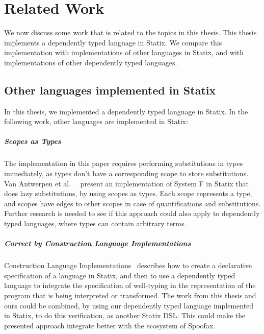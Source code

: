 \chapter{Related Work}
\label{ch:relatedwork}

We now discuss some work that is related to the topics in this thesis. This thesis implements a dependently typed language in Statix. We compare this implementation with implementations of other languages in Statix, and with implementations of other dependently typed languages.

\section{Other languages implemented in Statix}

In this thesis, we implemented a dependently typed language in Statix. In the following work, other languages are implemented in Statix:

\paragraph{Scopes as Types}

The implementation in this paper requires performing substitutions in types immediately, as types don't have a corresponding scope to store substitutions. Van Antwerpen et al.~\cite[sect 2.5]{scopes_as_types}~\cite{nameres} present an implementation of System F in Statix that does lazy substitutions, by using scopes as types. Each scope represents a type, and scopes have edges to other scopes in case of quantifications and substitutions. Further research is needed to see if this approach could also apply to dependently typed languages, where types can contain arbitrary terms. 

\paragraph{Correct by Construction Language Implementations}

Construction Language Implementations~\cite{Rouvoet21} describes how to create a declarative specification of a language in Statix, and then to use a dependently typed language to integrate the specification of well-typing in the representation of the program that is being interpreted or transformed. The work from this thesis and ours could be combined, by using our dependently typed language implemented in Statix, to do this verification, as another Statix DSL. This could make the presented approach integrate better with the ecosystem of Spoofax.

